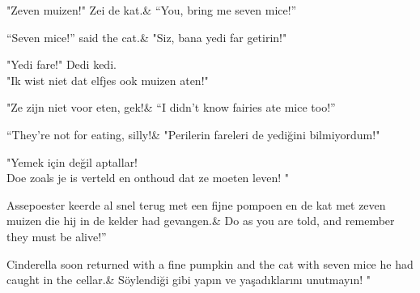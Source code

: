 "Zeven muizen!" Zei de kat.&
“You, bring me seven mice!”

“Seven mice!” said the cat.&
"Siz, bana yedi far getirin!"

"Yedi fare!" Dedi kedi.\\
"Ik wist niet dat elfjes ook muizen aten!"

"Ze zijn niet voor eten, gek!&
“I didn’t know fairies ate mice too!”

“They’re not for eating, silly!&
"Perilerin fareleri de yediğini bilmiyordum!"

"Yemek için değil aptallar!\\
Doe zoals je is verteld en onthoud dat ze moeten leven! "

Assepoester keerde al snel terug met een fijne pompoen en de kat met zeven muizen die hij in de kelder had gevangen.&
Do as you are told, and remember they must be alive!”

Cinderella soon returned with a fine pumpkin and the cat with seven mice he had caught in the cellar.&
Söylendiği gibi yapın ve yaşadıklarını unutmayın! "

